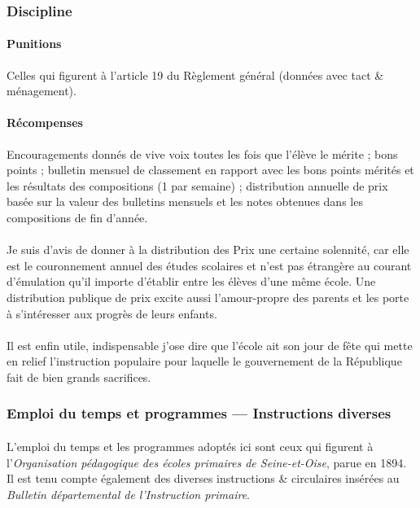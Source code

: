 \documentclass[../eBook.tex]{subfiles}
\begin{document}
    \subsubsection*{Discipline}
      \paragraph{Punitions}Celles qui figurent à l'article 19 du Règlement général (données avec tact \& ménagement).
      \paragraph{Récompenses}Encouragements donnés de vive voix toutes les fois que l'élève le mérite ; bons points ; bulletin mensuel de classement en rapport avec les bons points mérités et les résultats des compositions (1 par semaine) ; distribution annuelle de prix basée sur la valeur des bulletins mensuels et les notes obtenues dans les compositions de fin d'année.
      \paragraph{}Je suis d'avis de donner à la distribution des Prix une certaine solennité, car elle est le couronnement annuel des études scolaires et n'est pas étrangère au courant d'émulation qu'il importe d'établir entre les élèves d'une même école. Une distribution publique de prix excite aussi l'amour-propre des parents et les porte à s'intéresser aux progrès de leurs enfants.
      \paragraph{}Il est enfin utile, indispensable j'ose dire que l'école ait son jour de fête qui mette en relief l'instruction populaire pour laquelle le gouvernement de la République fait de bien grands sacrifices.

    \subsubsection*{Emploi du temps et programmes --- Instructions diverses}
      \paragraph{}L'emploi du temps et les programmes adoptés ici sont ceux qui figurent à l'\textit{Organisation pédagogique des écoles primaires de Seine-et-Oise}, parue en 1894. Il est tenu compte également des diverses instructions \& circulaires insérées au \textit{Bulletin départemental de l'Instruction primaire}.
\end{document}
